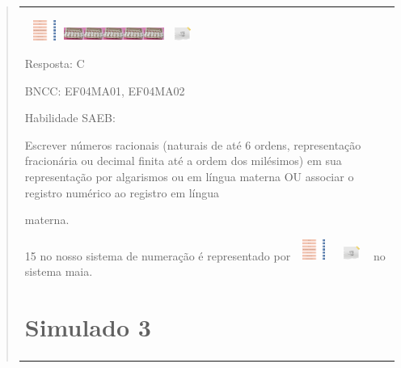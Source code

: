 \begin{enumerate}
\begin{escolha}
\begin{enumerate}
\begin{itemize}
\begin{itemize}
\begin{escolha}
\begin{quote}
\begin{escolha}
{\begin{longtable}[]{@{}l@{}}
\begin{itemize}
\begin{enumerate}
  \includegraphics[width=0.50004in,height=0.26669in]{media/image14.png}\includegraphics[width=0.25836in,height=0.18335in]{media/image15.png}\includegraphics[width=0.25836in,height=0.18335in]{media/image15.png}\includegraphics[width=0.25836in,height=0.18335in]{media/image15.png}\includegraphics[width=0.25836in,height=0.18335in]{media/image15.png}\includegraphics[width=0.25836in,height=0.18335in]{media/image15.png}\includegraphics[width=0.47504in,height=0.18335in]{media/image16.png}
\end{enumerate}

Resposta: C

BNCC: EF04MA01, EF04MA02

Habilidade SAEB:

Escrever números racionais (naturais de até 6 ordens, representação
fracionária ou decimal finita até a ordem dos milésimos) em sua
representação por algarismos ou em língua materna OU associar o registro
numérico ao registro em língua

materna.

15 no nosso sistema de numeração é representado por
\includegraphics[width=0.50004in,height=0.26669in]{media/image14.png}\includegraphics[width=0.47504in,height=0.18335in]{media/image16.png}
no sistema maia.

\section{Simulado 3}\label{simulado-3}


\end{itemize}
\end{longtable}}
\end{escolha}
\end{quote}
\end{escolha}
\end{itemize}
\end{itemize}
\end{enumerate}
\end{escolha}
\end{enumerate}
